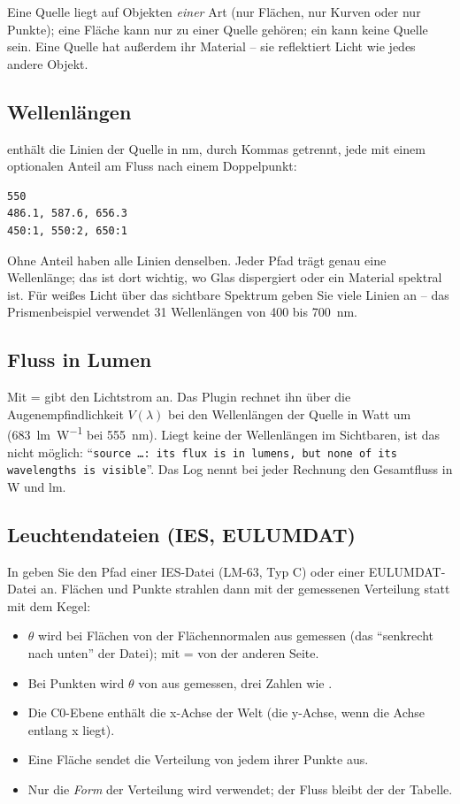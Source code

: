 Eine Quelle liegt auf Objekten \emph{einer} Art (nur Flächen, nur Kurven oder nur Punkte); eine
Fläche kann nur zu einer Quelle gehören; ein  kann keine Quelle sein. Eine Quelle
hat außerdem ihr Material -- sie reflektiert Licht wie jedes andere Objekt.

\subsection{Wellenlängen}\label{sec:pt-wellenlaengen}

 enthält die Linien der Quelle in nm, durch Kommas getrennt, jede mit einem
optionalen Anteil am Fluss nach einem Doppelpunkt:
\begin{lstlisting}
550
486.1, 587.6, 656.3
450:1, 550:2, 650:1
\end{lstlisting}
Ohne Anteil haben alle Linien denselben. Jeder Pfad trägt genau eine Wellenlänge; das ist dort
wichtig, wo Glas dispergiert oder ein Material spektral ist. Für weißes Licht über das sichtbare
Spektrum geben Sie viele Linien an -- das Prismenbeispiel verwendet 31 Wellenlängen von 400 bis
\SI{700}{\nano\metre}.

\subsection{Fluss in Lumen}

Mit  =  gibt  den Lichtstrom an. Das Plugin rechnet ihn über die
Augenempfindlichkeit $V(\lambda)$ bei den Wellenlängen der Quelle in Watt um
(\SI{683}{\lumen\per\watt} bei \SI{555}{\nano\metre}). Liegt keine der Wellenlängen im Sichtbaren,
ist das nicht möglich: \enquote{\texttt{source …: its flux is in lumens, but none of its
wavelengths is visible}}. Das Log nennt bei jeder Rechnung den Gesamtfluss in W und lm.

\subsection{Leuchtendateien (IES, EULUMDAT)}\label{sec:pt-leuchtendateien}

In  geben Sie den Pfad einer IES-Datei (LM-63, Typ C) oder einer
EULUMDAT-Datei an. Flächen und Punkte strahlen dann mit der gemessenen Verteilung statt mit dem
Kegel:
\begin{itemize}
  \item $\theta$ wird bei Flächen von der Flächennormalen aus gemessen (das \enquote{senkrecht
    nach unten} der Datei); mit  =  von der anderen Seite.
  \item Bei Punkten wird $\theta$ von  aus gemessen, drei Zahlen wie
    .
  \item Die C0-Ebene enthält die x-Achse der Welt (die y-Achse, wenn die Achse entlang x liegt).
  \item Eine Fläche sendet die Verteilung von jedem ihrer Punkte aus.
  \item Nur die \emph{Form} der Verteilung wird verwendet; der Fluss bleibt der der Tabelle.
\end{itemize}

